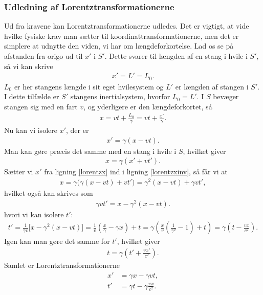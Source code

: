 \subsubsection{Udledning af Lorentztransformationerne}
Ud fra kravene kan Lorentztransformationerne udledes. Det er vigtigt, at vide hvilke fysiske krav man sætter til koordinattransformationerne, men det er simplere at udnytte den viden, vi har om længdeforkortelse. Lad os se på afstanden fra origo ud til $x'$ i $S'$.
Dette svarer til længden af en stang i hvile i $S'$, så vi kan skrive
%
\begin{align}
    x' = L' = L_0.
\end{align}
%
$L_0$ er her stangens længde i sit eget hvilesystem og $L'$ er længden af stangen i $S'$. I dette tilfælde er $S'$ stangens inertialsystem, hvorfor $L_0 = L'$.
I $S$ bevæger stangen sig med en fart $v$, og yderligere er den længdeforkortet, så
%
\begin{align}
    x = vt+\frac{L_0}{\gamma} = vt+\frac{x'}{\gamma}.
\end{align}
%
Nu kan vi isolere $x'$, der er
%
\begin{align}
    x' = \gamma(x-vt). \label{lorentzx}
\end{align}
%
Man kan gøre præcis det samme med en stang i hvile i $S$, hvilket giver
%
\begin{align}
    x = \gamma(x'+vt').\label{lorentzxinv}
\end{align}
%
Sætter vi $x'$ fra ligning \eqref{lorentzx} ind i ligning \eqref{lorentzxinv}, så får vi at
%
\begin{align}
    x = \gamma\Big(\gamma(x-vt)+vt'\Big) = \gamma^2(x-vt) + \gamma vt',
\end{align}
%
hvilket også kan skrives som
%
\begin{align}
    \gamma vt' = x - \gamma^2(x-vt).
\end{align}
%
hvori vi kan isolere $t'$:
%
\begin{align}
    t' = \frac{1}{\gamma v}\Big[x - \gamma^2(x-vt)\Big] = \frac{1}{v}\left(\frac{x}{\gamma}-\gamma x\right) + t = \gamma \left(\frac{x}{v}\left(\frac{1}{\gamma^2}-1\right)+t\right)=\gamma\left(t-\frac{vx}{c^2}\right).
\end{align}
%
Igen kan man gøre det samme for $t'$, hvilket giver
%
\begin{align}
    t = \gamma\left(t'+\frac{vx'}{c^2}\right).
\end{align}
%
Samlet er Lorentztransformationerne
%
\begin{subequations}
\begin{align}
    x'&=\gamma x-\gamma vt, \label{rel:LorentzXComposant} \\
    t'&=\gamma t-\gamma\frac{vx}{c^2}. \label{rel:LorentzTComposant}
\end{align}
\end{subequations}
